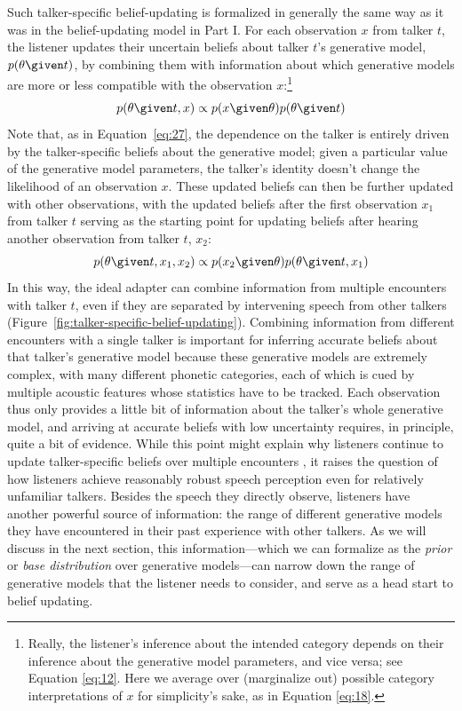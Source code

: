 Such talker-specific belief-updating is formalized in generally the same way as it was in the belief-updating model in Part I.  For each observation $x$ from talker $t$, the listener updates their uncertain beliefs about talker $t$'s generative model, $p(\theta \given t)$, by combining them with information about which generative models are more or less compatible with the observation $x$:\footnote{Really, the listener's inference about the intended category depends on their inference about the generative model parameters, and vice versa; see Equation \eqref{eq:12}.  Here we average over (marginalize out) possible category interpretations of $x$ for simplicity's sake, as in Equation \eqref{eq:18}.}
\begin{equation}
  \label{eq:28}
  p(\theta \given t, x) \propto p(x \given \theta) p(\theta \given t)
\end{equation}
Note that, as in Equation~\eqref{eq:27}, the dependence on the talker is entirely driven by the talker-specific beliefs about the generative model; given a particular value of the generative model parameters, the talker's identity doesn't change the likelihood of an observation $x$.
These updated beliefs can then be further updated with other observations, with the updated beliefs after the first observation $x_1$ from talker $t$ serving as the starting point for updating beliefs after hearing another observation from talker $t$, $x_2$: 
\begin{equation}
  \label{eq:29}
  p(\theta \given t, x_1, x_2) \propto p(x_2 \given \theta) p(\theta \given t, x_1)
\end{equation}
In this way, the ideal adapter can combine information from multiple encounters with talker $t$, even if they are separated by intervening speech from other talkers (Figure~\ref{fig:talker-specific-belief-updating}).  Combining information from different encounters with a single talker is important for inferring accurate beliefs about that talker's generative model because these generative models are extremely complex, with many different phonetic categories, each of which is cued by multiple acoustic features whose statistics have to be tracked.  Each observation thus only provides a little bit of information about the talker's whole generative model, and arriving at accurate beliefs with low uncertainty requires, in principle, quite a bit of evidence.  While this point might explain why listeners continue to update talker-specific beliefs over multiple encounters \autocite[preliminary evidence for which is provided by][]{Munson2011}, it raises the question of how listeners achieve reasonably robust speech perception even for relatively unfamiliar talkers.  Besides the speech they directly observe, listeners have another powerful source of information: the range of different generative models they have encountered in their past experience with other talkers.  As we will discuss in the next section, this information---which we can formalize as the \emph{prior} or \emph{base distribution} over generative models---can narrow down the range of generative models that the listener needs to consider, and serve as a head start to belief updating.

